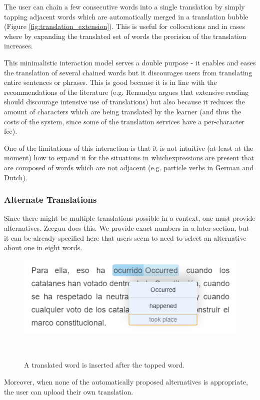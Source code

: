 The user can chain a few consecutive words into a single translation by simply tapping adjacent words which are automatically merged in a translation bubble (Figure \ref{fig:translation_extension}). This is useful for collocations and in cases where by expanding the translated set of words the precision of the translation increases. 

This minimalistic interaction model serves a double purpose - it enables and eases the translation of several chained words but it discourages users from translating entire sentences or phrases. This is good because it is in line with the recommendations of the literature (e.g. Renandya argues that extensive reading should discourage intensive use of translations\cite{renadya07-power}) but also because it reduces the amount of characters which are being translated by the learner (and thus the costs of the system, since some of the translation services have a per-character fee). 

One of the limitations of this interaction is that it is not intuitive (at least at the moment) how to expand it for the situations in whichexpressions are present that are composed of words which are not adjacent (e.g. particle verbs in German and Dutch).


\subsubsection{Alternate Translations}
Since there might be multiple translations possible in a context, one must provide alternatives. Zeeguu does this. We provide exact numbers in a later section, but it can be already specified here that users seem to need to select an alternative about one in eight words.

\begin{figure}[h!]
\centering
  \includegraphics[width=0.8\columnwidth]{figures/translation_alter_menu}
  \caption{A translated word is inserted after the tapped word.}~\label{fig:registrations}
\end{figure}

Moreover, when none of the automatically proposed alternatives is appropriate, the user can upload their own translation.


